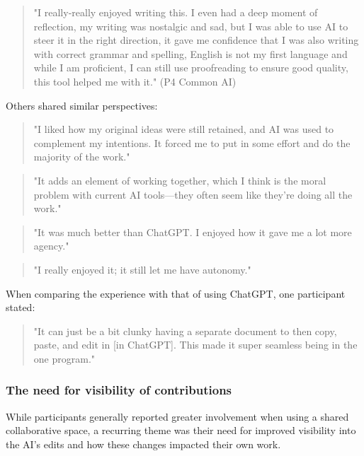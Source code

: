 \begin{quote}
"I really-really enjoyed writing this. I even had a deep moment of reflection, my writing was nostalgic and sad, but I was able to use AI to steer it in the right direction, it gave me confidence that I was also writing with correct grammar and spelling, English is not my first language and while I am proficient, I can still use proofreading to ensure good quality, this tool helped me with it." (P4 Common AI)
\end{quote}

Others shared similar perspectives:

\begin{quote}
 "I liked how my original ideas were still retained, and AI was used to complement my intentions. It forced me to put in some effort and do the majority of the work."
\end{quote}

\begin{quote}
    "It adds an element of working together, which I think is the moral problem with current AI tools—they often seem like they're doing all the work."
\end{quote}

\begin{quote}
    "It was much better than ChatGPT. I enjoyed how it gave me a lot more agency." 
\end{quote}

\begin{quote}
    "I really enjoyed it; it still let me have autonomy."
\end{quote}

When comparing the experience with that of using ChatGPT, one participant stated:

\begin{quote}
"It can just be a bit clunky having a separate document to then copy, paste, and edit in [in ChatGPT]. This made it super seamless being in the one program."
\end{quote}


\subsubsection{The need for visibility of contributions}

While participants generally reported greater involvement when using a shared collaborative space, a recurring theme was their need for improved visibility into the AI's edits and how these changes impacted their own work.


